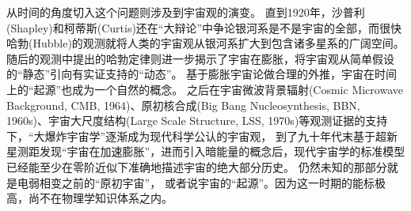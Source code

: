 从时间的角度切入这个问题则涉及到宇宙观的演变。
直到1920年，沙普利(Shapley)和柯蒂斯(Curtis)还在“大辩论”中争论银河系是不是宇宙的全部，而很快哈勃(Hubble)的观测就将人类的宇宙观从银河系扩大到包含诸多星系的广阔空间。%
随后的观测中提出的哈勃定律则进一步揭示了宇宙在膨胀，将宇宙观从简单假设的“静态”引向有实证支持的“动态”。%
基于膨胀宇宙论做合理的外推，宇宙在时间上的“起源”也成为一个自然的概念。
之后在宇宙微波背景辐射(Cosmic Microwave Background, CMB, 1964)、原初核合成(Big Bang Nucleosynthesis, BBN, 1960s)、宇宙大尺度结构(Large Scale Structure, LSS, 1970s)等观测证据的支持下，“大爆炸宇宙学”逐渐成为现代科学公认的宇宙观，
到了九十年代末基于超新星测距发现“宇宙在加速膨胀”，进而引入暗能量的概念后，现代宇宙学的标准模型已经能至少在零阶近似下准确地描述宇宙的绝大部分历史。
仍然未知的那部分就是电弱相变之前的“原初宇宙”，%
或者说宇宙的“起源”。因为这一时期的能标极高，尚不在物理学知识体系之内。

